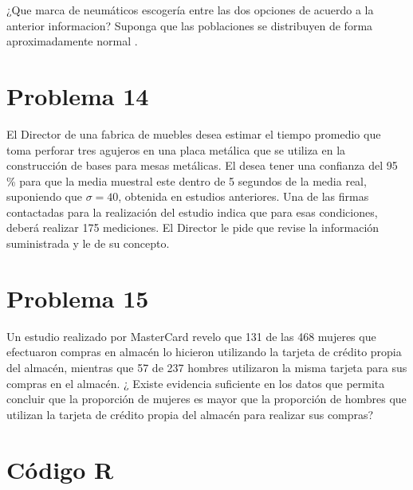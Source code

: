 \documentclass[
]{article}
\begin{document}
¿Que marca de neumáticos escogería entre las dos opciones de acuerdo a
la anterior informacion? Suponga que las poblaciones se distribuyen de
forma aproximadamente normal .

\hypertarget{problema-14}{%
\section{\texorpdfstring{\textbf{Problema
14}}{Problema 14}}\label{problema-14}}

El Director de una fabrica de muebles desea estimar el tiempo promedio
que toma perforar tres agujeros en una placa metálica que se utiliza en
la construcción de bases para mesas metálicas. El desea tener una
confianza del 95 \% para que la media muestral este dentro de 5 segundos
de la media real, suponiendo que \(\sigma=40\), obtenida en estudios
anteriores. Una de las firmas contactadas para la realización del
estudio indica que para esas condiciones, deberá realizar 175
mediciones. El Director le pide que revise la información suministrada y
le de su concepto.

\hypertarget{problema-15}{%
\section{\texorpdfstring{\textbf{Problema
15}}{Problema 15}}\label{problema-15}}

Un estudio realizado por MasterCard revelo que 131 de las 468 mujeres
que efectuaron compras en almacén lo hicieron utilizando la tarjeta de
crédito propia del almacén, mientras que 57 de 237 hombres utilizaron la
misma tarjeta para sus compras en el almacén. ¿ Existe evidencia
suficiente en los datos que permita concluir que la proporción de
mujeres es mayor que la proporción de hombres que utilizan la tarjeta de
crédito propia del almacén para realizar sus compras?

\hypertarget{cuxf3digo-r}{%
\section{\texorpdfstring{\textbf{Código
R}}{Código R}}\label{cuxf3digo-r}}
\end{document}
